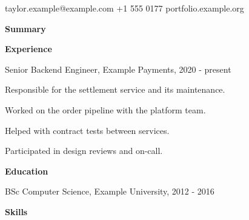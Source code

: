 \documentclass[10pt]{article}
\begin{document}
{\LARGE \Person}\par taylor.example@example.com \quad +1 555 0177 \quad portfolio.example.org\par\bigskip
\textbf{Summary}\par \Summary\par\medskip
\textbf{Experience}\par Senior Backend Engineer, Example Payments, 2020 - present\par
\textbullet{} Responsible for the settlement service and its maintenance.\par
\textbullet{} Worked on the order pipeline with the platform team.\par
\textbullet{} Helped with contract tests between services.\par
\textbullet{} Participated in design reviews and on-call.\par\medskip
\textbf{Education}\par BSc Computer Science, Example University, 2012 - 2016\par\medskip
\textbf{Skills}\par \SkillsLine\par
\end{document}
